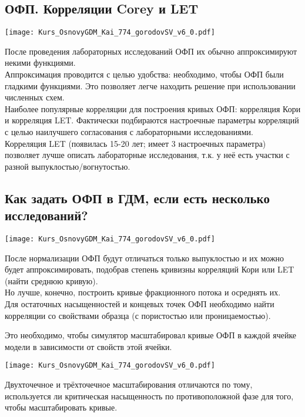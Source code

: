 \documentclass[main.tex]{subfiles}
\begin{document}
\subsection{ОФП. Корреляции Corey и LET}

\texttt{[image: Kurs\_OsnovyGDM\_Kai\_774\_gorodovSV\_v6\_0.pdf]}

После проведения лабораторных исследований ОФП их обычно аппроксимируют некими функциями.
\\

Аппроксимация проводится с целью удобства: необходимо, чтобы ОФП были гладкими функциями.
Это позволяет легче находить решение при использовании численных схем.
\\

Наиболее популярные корреляции для построения кривых ОФП: корреляция Кори и корреляция LET.
Фактически подбираются настроечные параметры корреляций с целью наилучшего согласования с лабораторными исследованиями.
\\

Корреляция LET (появилась 15-20 лет; имеет 3 настроечных параметра) позволяет лучше описать лабораторные исследования, т.к. у неё есть участки с разной выпуклостью/вогнутостью.

\subsection{Как задать ОФП в ГДМ, если есть несколько исследований?}

\texttt{[image: Kurs\_OsnovyGDM\_Kai\_774\_gorodovSV\_v6\_0.pdf]}

После нормализации ОФП будут отличаться только выпуклостью и их можно будет аппроксимировать, подобрав степень кривизны корреляций Кори или LET (найти среднюю кривую).
\\

Но лучше, конечно, построить кривые фракционного потока и осреднять их.
\\

Для остаточных насыщенностей и концевых точек ОФП необходимо найти корреляции со свойствами образца (с пористостью или проницаемостью).

Это необходимо, чтобы симулятор масштабировал кривые ОФП в каждой ячейке модели в зависимости от свойств этой ячейки.

\texttt{[image: Kurs\_OsnovyGDM\_Kai\_774\_gorodovSV\_v6\_0.pdf]}

Двухточечное и трёхточечное масштабирования отличаются по тому, используется ли критическая насыщенность по противоположной фазе для того, чтобы масштабировать кривые.
\end{document}
